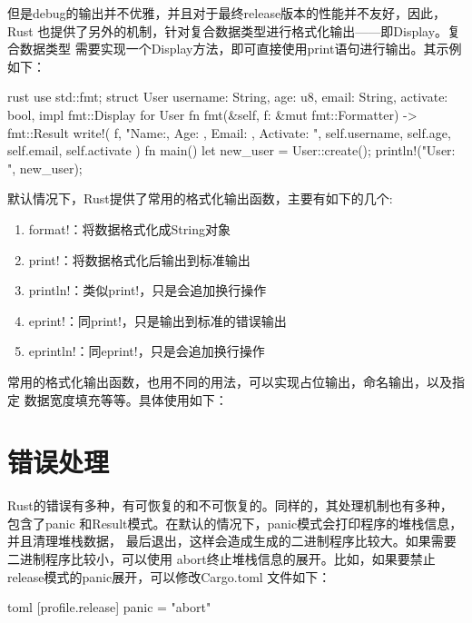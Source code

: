 但是debug的输出并不优雅，并且对于最终release版本的性能并不友好，因此，Rust
也提供了另外的机制，针对复合数据类型进行格式化输出——即Display。复合数据类型
需要实现一个Display方法，即可直接使用print语句进行输出。其示例如下：
\begin{code-block}{rust}
use std::fmt;
struct User {
    username: String,
    age: u8,
    email: String,
    activate: bool,
}
impl fmt::Display for User {
    fn fmt(&self, f: &mut fmt::Formatter) -> fmt::Result {
        write!(
            f,
            "Name:{}, Age: {}, Email: {}, Activate: {}",
            self.username, self.age, self.email, self.activate
        )
    }
}
fn main() {
    let new_user = User::create();
    println!("User: {}", new_user);
}
\end{code-block}

默认情况下，Rust提供了常用的格式化输出函数，主要有如下的几个:
\begin{enumerate}
  \item format!：将数据格式化成String对象
  \item print!：将数据格式化后输出到标准输出
  \item println!：类似print!，只是会追加换行操作
  \item eprint!：同print!，只是输出到标准的错误输出
  \item eprintln!：同eprint!，只是会追加换行操作
\end{enumerate}
常用的格式化输出函数，也用不同的用法，可以实现占位输出，命名输出，以及指定
数据宽度填充等等。具体使用如下：
\section{错误处理}
Rust的错误有多种，有可恢复的和不可恢复的。同样的，其处理机制也有多种，包含了panic
和Result模式。在默认的情况下，panic模式会打印程序的堆栈信息，并且清理堆栈数据，
最后退出，这样会造成生成的二进制程序比较大。如果需要二进制程序比较小，可以使用
abort终止堆栈信息的展开。比如，如果要禁止release模式的panic展开，可以修改Cargo.toml
文件如下：
\begin{code-block}{toml}
[profile.release]
panic = "abort"
\end{code-block}

